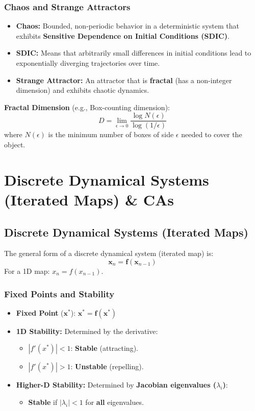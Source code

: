 \documentclass{report}
\begin{document}
\subsection*{Chaos and Strange Attractors}
\begin{itemize}
    \item \textbf{Chaos:} Bounded, non-periodic behavior in a deterministic system that exhibits \textbf{Sensitive Dependence on Initial Conditions (SDIC)}.
    \item \textbf{SDIC:} Means that arbitrarily small differences in initial conditions lead to exponentially diverging trajectories over time.
    \item \textbf{Strange Attractor:} An attractor that is \textbf{fractal} (has a non-integer dimension) and exhibits chaotic dynamics.
\end{itemize}

\textbf{Fractal Dimension} (e.g., Box-counting dimension):
\[
D = \lim_{\epsilon \to 0} \frac{\log N(\epsilon)}{\log(1/\epsilon)}
\]
where $N(\epsilon)$ is the minimum number of boxes of side $\epsilon$ needed to cover the object.

\chapter*{Discrete Dynamical Systems (Iterated Maps) \& CAs}

\section*{Discrete Dynamical Systems (Iterated Maps)}
The general form of a discrete dynamical system (iterated map) is:
\[
\mathbf{x}_n = \mathbf{f}(\mathbf{x}_{n-1})
\]
For a 1D map: $x_n = f(x_{n-1})$.

\subsection*{Fixed Points and Stability}
\begin{itemize}
    \item \textbf{Fixed Point} ($\mathbf{x}^{*}$): $\mathbf{x}^{*} = \mathbf{f}(\mathbf{x}^{*})$
    \item \textbf{1D Stability:} Determined by the derivative:
    \begin{itemize}
        \item $\left|f'(x^*)\right| < 1$: \textbf{Stable} (attracting).
        \item $\left|f'(x^*)\right| > 1$: \textbf{Unstable} (repelling).
    \end{itemize}
    \item \textbf{Higher-D Stability:} Determined by \textbf{Jacobian eigenvalues ($\lambda_i$)}:
    \begin{itemize}
        \item \textbf{Stable} if $|\lambda_i| < 1$ for \textbf{all} eigenvalues.
    \end{itemize}
\end{itemize}
\end{document}
